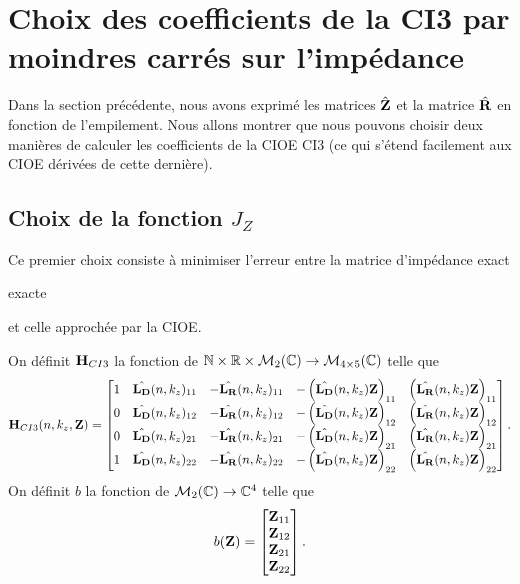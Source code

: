 \section[Choix 1 du calcul des coefficients de la CI3]{Choix des coefficients de la CI3 par moindres carrés sur l'impédance}

  Dans la section précédente, nous avons exprimé les matrices \(\hat{\mathbf{Z}}\) et la matrice \(\hat{\mathbf{R}}\) en fonction de l'empilement.
  Nous allons montrer que nous pouvons choisir deux manières de calculer les coefficients de la CIOE CI3 (ce qui s’étend facilement aux CIOE dérivées de cette dernière). 

  \subsection[Choix de la fonction Jz]{Choix de la fonction \(J_Z\)}
    Ce premier choix consiste à minimiser l'erreur entre la matrice d'impédance exact
\begin{REM}
  exacte
\end{REM} 
     et celle approchée par la CIOE.
    \begin{defn}
      On définit \(\mathbf{H}_{CI3}\) la fonction de \(\mathbb N \times \mathbb R \times \mathcal{M}_2(\mathbb C) \rightarrow \mathcal{M}_{4\times5}(\mathbb C)\) telle que
      \begin{equation*}
        \mathbf{H}_{CI3}(n,k_z,\mathbf{Z}) = \begin{bmatrix}
        1 & \hat{\mathbf{L_D}}(n,k_z)_{11} & -\hat{\mathbf{L_R}}(n,k_z)_{11} & -\left(\hat{\mathbf{L_D}}(n,k_z){\mathbf{Z}}\right)_{11} & \left(\hat{\mathbf{L_R}}(n,k_z){\mathbf{Z}}\right)_{11}
        \\
        0 & \hat{\mathbf{L_D}}(n,k_z)_{12} & -\hat{\mathbf{L_R}}(n,k_z)_{12} & -\left(\hat{\mathbf{L_D}}(n,k_z){\mathbf{Z}}\right)_{12} & \left(\hat{\mathbf{L_R}}(n,k_z){\mathbf{Z}}\right)_{12}
        \\
        0 & \hat{\mathbf{L_D}}(n,k_z)_{21} & -\hat{\mathbf{L_R}}(n,k_z)_{21} & -\left(\hat{\mathbf{L_D}}(n,k_z){\mathbf{Z}}\right)_{21} & \left(\hat{\mathbf{L_R}}(n,k_z){\mathbf{Z}}\right)_{21}
        \\
        1 & \hat{\mathbf{L_D}}(n,k_z)_{22} & -\hat{\mathbf{L_R}}(n,k_z)_{22} & -\left(\hat{\mathbf{L_D}}(n,k_z){\mathbf{Z}}\right)_{22} & \left(\hat{\mathbf{L_R}}(n,k_z){\mathbf{Z}}\right)_{22}
        \end{bmatrix}.
      \end{equation*}
      On définit \(b\) la fonction de \(\mathcal{M}_2(\mathbb C) \rightarrow \mathbb C^4\) telle que
      \begin{equation*}
        b(\mathbf{Z}) = \begin{bmatrix}
        {\mathbf{Z}}_{11}
        \\
        {\mathbf{Z}}_{12}
        \\
        {\mathbf{Z}}_{21}
        \\
        {\mathbf{Z}}_{22}
        \end{bmatrix}.
      \end{equation*}
    \end{defn}

